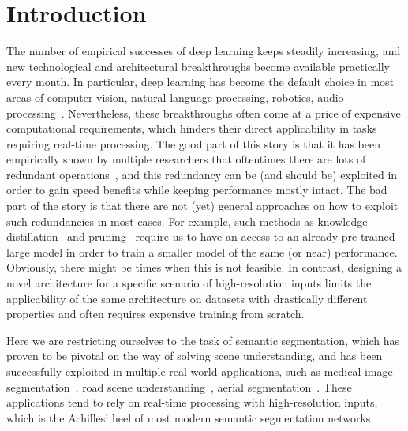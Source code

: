 \documentclass{bmvc2k}
\begin{document}
\section{Introduction}
\label{sec:intro}
The number of empirical successes of deep learning keeps steadily increasing, and new technological and architectural breakthroughs become available practically every month. In particular, deep learning has become the default choice in most areas of computer vision, natural language processing, robotics, audio processing~\cite{KrizhevskySH12,SermanetEZMFL13,GirshickDDM14,SimonyanZ14a,SzegedyLJSRAEVR14,ZeilerF14,Girshick15,KarpathyL15,LillicrapHPHETS15,RenHG015,VinyalsTBE15,XuBKCCSZB15,OordDZSVGKSK16,GuHLL17}. Nevertheless, these breakthroughs often come at a price of expensive computational requirements, which hinders their direct applicability in tasks requiring real-time processing. The good part of this story is that it has been empirically shown by multiple researchers that oftentimes there are lots of redundant operations~\cite{DenilSDRF13,BaC14,DentonZBLF14,JaderbergVZ14,HanPTD15,HintonVD15,UrbanGKAWCMPR16}, and this redundancy can be (and should be) exploited in order to gain speed benefits while keeping performance mostly intact. The bad part of the story is that there are not (yet) general approaches on how to exploit such redundancies in most cases. For example, such methods as knowledge distillation~\cite{BaC14,HintonVD15,BucilaCN06,RomeroBKCGB14} and pruning~\cite{HanPTD15,CunDS89,HassibiS92,HanMD15} require us to have an access to an already pre-trained large model in order to train a smaller model of the same (or near) performance. Obviously, there might be times when this is not feasible. In contrast, designing a novel architecture for a specific scenario of high-resolution inputs \cite{PaszkeCKC16,ZhaoQSSJ17} limits the applicability of the same architecture on datasets with drastically different properties and often requires expensive training from scratch.
	
	Here we are restricting ourselves to the task of semantic segmentation, which has proven to be pivotal on the way of solving scene understanding, and has been successfully exploited in multiple real-world applications, such as medical image segmentation~\cite{CiresanGGS12,RonnebergerFB15}, road scene understanding~\cite{BadrinarayananH15,XuGYD17}, aerial segmentation~\cite{KlucknerMRB09,MnihH10}. These applications tend to rely on real-time processing with high-resolution inputs, which is the Achilles' heel of most modern semantic segmentation networks.
	
\end{document}
